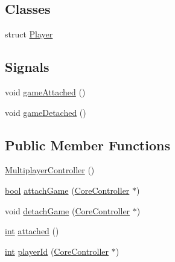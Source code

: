 \subsection*{Classes}
\begin{DoxyCompactItemize}
\item 
struct \mbox{\hyperlink{class_q_g_b_a_1_1_multiplayer_controller_struct_q_g_b_a_1_1_multiplayer_controller_1_1_player}{Player}}
\end{DoxyCompactItemize}
\subsection*{Signals}
\begin{DoxyCompactItemize}
\item 
void \mbox{\hyperlink{class_q_g_b_a_1_1_multiplayer_controller_ab2affa28eb8bec202428b5ccb7240e93}{game\+Attached}} ()
\item 
void \mbox{\hyperlink{class_q_g_b_a_1_1_multiplayer_controller_a9b536ffaf180c76b90350929d9daa4e7}{game\+Detached}} ()
\end{DoxyCompactItemize}
\subsection*{Public Member Functions}
\begin{DoxyCompactItemize}
\item 
\mbox{\hyperlink{class_q_g_b_a_1_1_multiplayer_controller_a2b20b2d598b93284d460940d13addd58}{Multiplayer\+Controller}} ()
\item 
\mbox{\hyperlink{libretro_8h_a4a26dcae73fb7e1528214a068aca317e}{bool}} \mbox{\hyperlink{class_q_g_b_a_1_1_multiplayer_controller_a58149beb11ba0c0970cf37f86e74c4f4}{attach\+Game}} (\mbox{\hyperlink{class_q_g_b_a_1_1_core_controller}{Core\+Controller}} $\ast$)
\item 
void \mbox{\hyperlink{class_q_g_b_a_1_1_multiplayer_controller_a4527bd49027a633ca073fa002d7492b3}{detach\+Game}} (\mbox{\hyperlink{class_q_g_b_a_1_1_core_controller}{Core\+Controller}} $\ast$)
\item 
\mbox{\hyperlink{ioapi_8h_a787fa3cf048117ba7123753c1e74fcd6}{int}} \mbox{\hyperlink{class_q_g_b_a_1_1_multiplayer_controller_a198d9f12525ba6ff641510acaf780ed2}{attached}} ()
\item 
\mbox{\hyperlink{ioapi_8h_a787fa3cf048117ba7123753c1e74fcd6}{int}} \mbox{\hyperlink{class_q_g_b_a_1_1_multiplayer_controller_a026387b700c0e6935190107434fbe103}{player\+Id}} (\mbox{\hyperlink{class_q_g_b_a_1_1_core_controller}{Core\+Controller}} $\ast$)
\end{DoxyCompactItemize}
